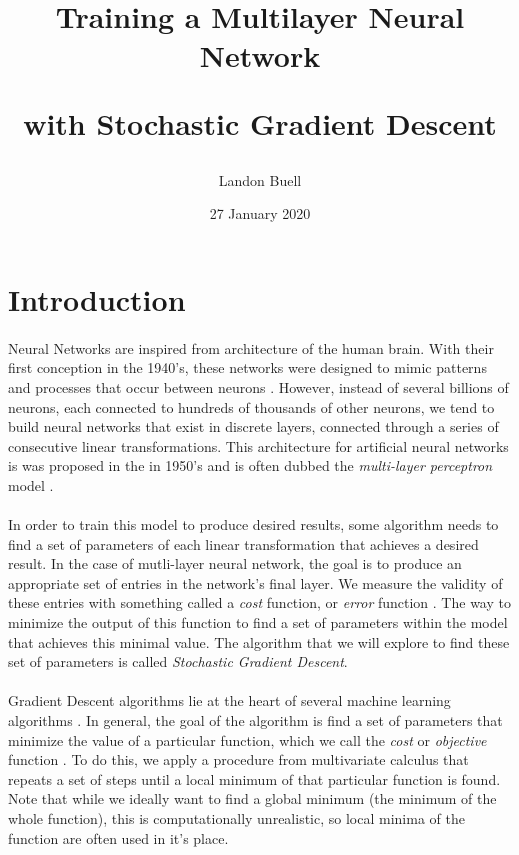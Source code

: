 \documentclass[12pt,letterpaper]{article}
\begin{document}

\title{
\begin{Huge}
Training a Multilayer Neural Network \\
\end{Huge} 
\Large with Stochastic Gradient Descent}
\author{Landon Buell}
\date{27 January 2020}
\maketitle


\section{Introduction}
\paragraph*{}Neural Networks are inspired from architecture of the human brain. With their first conception in the 1940's, these networks were designed to mimic patterns and processes that occur between neurons \cite{McCulloch}. However, instead of several billions of neurons, each connected to hundreds of thousands of other neurons, we tend to build neural networks that exist in discrete layers, connected through a series of consecutive linear transformations. This architecture for artificial neural networks is was proposed in the in 1950's and is often dubbed the \textit{multi-layer perceptron} model \cite{Geron}. 
\paragraph*{}In order to train this model to produce desired results, some algorithm needs to find a set of parameters of each linear transformation that achieves a desired result. In the case of mutli-layer neural network, the goal is to produce an appropriate set of entries in the network's final layer. We measure the validity of these entries with something called a \textit{cost} function, or \textit{error} function \cite{Goodfellow}. The way to minimize the output of this function to find a set of parameters within the model that achieves this minimal value. The algorithm that we will explore to find these set of parameters is called \textit{Stochastic Gradient Descent}.
\paragraph*{}Gradient Descent algorithms lie at the heart of several machine learning algorithms \cite{Goodfellow}. In general, the goal of the algorithm is find a set of parameters that minimize the value of a particular function, which we call the \textit{cost} or \textit{objective} function \cite{James}. To do this, we apply a procedure from multivariate calculus that repeats a set of steps until a local minimum of that particular function is found. Note that while we ideally want to find a global minimum (the minimum of the whole function), this is computationally unrealistic, so local minima of the function are often used in it's place. 
\end{document}
